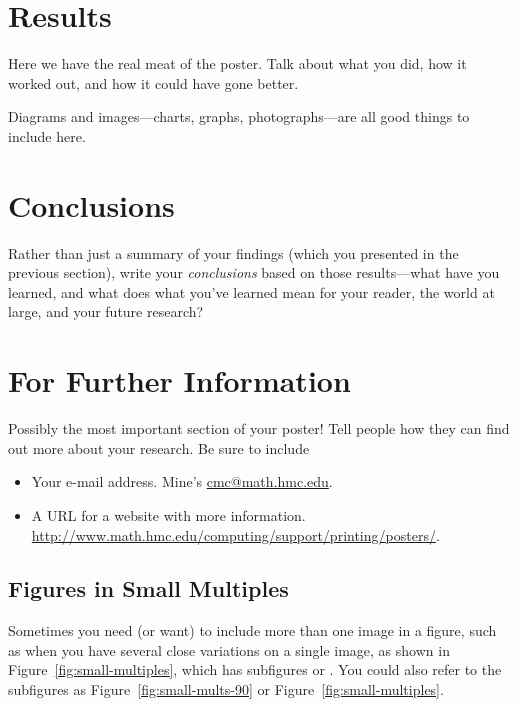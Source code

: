 \documentclass[clinic]{hmcposter}
\begin{document}
\begin{poster}
\section{Results}%

Here we have the real meat of the poster.  Talk about what you did,
how it worked out, and how it could have gone better.

Diagrams and images---charts, graphs, photographs---are all good
things to include here.


\section{Conclusions}

Rather than just a summary of your findings (which you presented in
the previous section), write your \emph{conclusions} based on those
results---what have you learned, and what does what you've learned
mean for your reader, the world at large, and your future research?


\section{For Further Information}

Possibly the most important section of your poster!  Tell people
how they can find out more about your research.  Be sure to
include
\begin{itemize}
\item Your e-mail address.  Mine's \url{cmc@math.hmc.edu}.
\item A URL for a website with more information.  \url{http://www.math.hmc.edu/computing/support/printing/posters/}.
\end{itemize}



\vfill
\columnbreak

\subsection{Figures in Small Multiples}

Sometimes you need (or want) to include more than one image in a
figure, such as when you have several close variations on a single
image, as shown in Figure~\ref{fig:small-multiples}, which has
subfigures  or
.  You could also refer to the subfigures
as Figure~\ref{fig:small-mults-90} or
Figure~\ref{fig:small-multiples}.


\end{poster}
\end{document}
